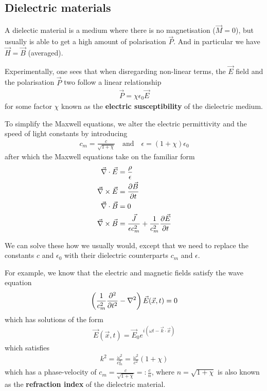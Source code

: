\subsection{Dielectric materials}
A dielectic material is a medium where there is no magnetisation ($\vec{M} = 0$), but usually is able to get a high amount of polarisation $\vec{P}$.
And in particular we have $\vec{H} = \vec{B}$ (averaged).

Experimentally, one sees that when disregarding non-linear terms, the $\vec{E}$ field and the polarisation $\vec{P}$ two follow a linear relationship
\begin{align*}
  \vec{P} = \chi \epsilon_0 \vec{E}
\end{align*}
for some factor $\chi$ known as the \textbf{electric susceptibility} of the dielectric medium.

To simplify the Maxwell equations, we alter the electric permittivity and the speed of light constants by introducing
\begin{align*}
  c_m = \frac{c}{\sqrt{1 + \chi}} \quad \text{and} \quad \epsilon = (1 + \chi) \epsilon_0
\end{align*}
after which the Maxwell equations take on the familiar form
\begin{align*}
  \vec{\nabla} \cdot \vec{E} 
  &= \frac{\rho}{\epsilon}\\
  \vec{\nabla} \times \vec{E} 
  &=  \frac{\partial \vec{B}}{\partial t}\\
  \vec{\nabla} \cdot \vec{B} &= 0\\
  \vec{\nabla} \times \vec{B} 
  &= \frac{\vec{J}}{\epsilon c_m^{2}} + \frac{1}{c_m^{2}} \frac{\partial \vec{E}}{\partial t}
\end{align*}

We can solve these how we usually would, except that we need to replace the constants $c$ and $\epsilon_0$ with their dielectric counterparts $c_m$ and $\epsilon$.

For example, we know that the electric and magnetic fields satisfy the wave equation
\begin{align*}
  \left(
    \frac{1}{c_m^{2}} \frac{\partial^{2}}{\partial t^{2}} - \nabla^{2}
  \right)
  \vec{E}(\vec{x},t) = 0
\end{align*}
which has solutions of the form
\begin{align*}
  \vec{E}(\vec{x},t) = \vec{E}_0 e^{i(\omega t - \vec{k} \cdot \vec{x})}
\end{align*}
which satisfies
\begin{align*}
  k^{2} = \frac{\omega^{2}}{c^{2}_m} = \frac{\omega^{2}}{c^{2}}(1 + \chi)
\end{align*}
which has a phase-velocity of $c_m = \frac{c}{\sqrt{1 + \chi}} =: \frac{c}{n}$, where $n = \sqrt{1 + \chi}$ is also known as the \textbf{refraction index} of the dielectric material.



